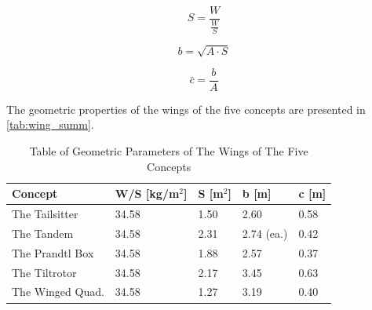
\begin{minipage}{0.33\textwidth}
    \begin{equation}
        S = \frac{W}{\frac{W}{S}}
        \label{eq:area}
    \end{equation}
    \end{minipage}%
    \begin{minipage}{0.33\textwidth}
    \begin{equation}
        b =\sqrt{A \cdot S}
        \label{eq:wingspan}
    \end{equation}
    \end{minipage}%
    \begin{minipage}{0.33\textwidth}
    \begin{equation}
        \bar{c} = \frac{b}{A}
        \label{eq:chord}
    \end{equation}
\end{minipage}

The geometric properties of the wings of the five concepts are presented in \autoref{tab:wing_summ}.

\begin{table}[htb]
    \centering
    \caption{Table of Geometric Parameters of The Wings of The Five Concepts}
    \label{tab:wing_summ}
    \begin{tabularx}{\textwidth}{p{}p{}p{}p{}p{}}
        \toprule
        \textbf{Concept} & \textbf{W/S [kg/m$^2$]}  & \textbf{S [m$^2$]} & \textbf{b [m]} & \textbf{c [m]}\\\midrule
        The Tailsitter          &34.58                      & 1.50       & 2.60 & 0.58
        \\ \hdashline
        The Tandem              &34.58                      & 2.31       & 2.74 (ea.) & 0.42
        \\ \hdashline
        The Prandtl Box         &34.58                      & 1.88       & 2.57 & 0.37
        \\ \hdashline
        The Tiltrotor          &34.58                      & 2.17       & 3.45 & 0.63
        \\ \hdashline
        The Winged Quad.   &34.58                      & 1.27       & 3.19 & 0.40 \\\bottomrule
    \end{tabularx}
\end{table}

